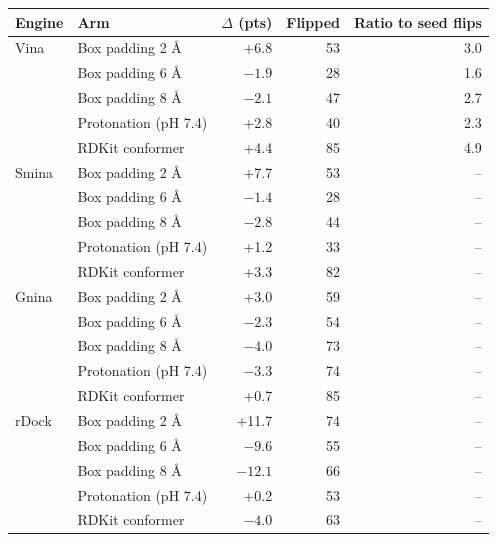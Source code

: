 \begin{tabular}{llrrr}
\toprule
Engine & Arm & $\Delta$ (pts) & Flipped & Ratio to seed flips \\
\midrule
Vina & Box padding 2 \AA{} & +6.8 & 53 & 3.0 \\
 & Box padding 6 \AA{} & $-1.9$ & 28 & 1.6 \\
 & Box padding 8 \AA{} & $-2.1$ & 47 & 2.7 \\
 & Protonation (pH 7.4) & +2.8 & 40 & 2.3 \\
 & RDKit conformer & +4.4 & 85 & 4.9 \\
\addlinespace
Smina & Box padding 2 \AA{} & +7.7 & 53 & -- \\
 & Box padding 6 \AA{} & $-1.4$ & 28 & -- \\
 & Box padding 8 \AA{} & $-2.8$ & 44 & -- \\
 & Protonation (pH 7.4) & +1.2 & 33 & -- \\
 & RDKit conformer & +3.3 & 82 & -- \\
\addlinespace
Gnina & Box padding 2 \AA{} & +3.0 & 59 & -- \\
 & Box padding 6 \AA{} & $-2.3$ & 54 & -- \\
 & Box padding 8 \AA{} & $-4.0$ & 73 & -- \\
 & Protonation (pH 7.4) & $-3.3$ & 74 & -- \\
 & RDKit conformer & +0.7 & 85 & -- \\
\addlinespace
rDock & Box padding 2 \AA{} & +11.7 & 74 & -- \\
 & Box padding 6 \AA{} & $-9.6$ & 55 & -- \\
 & Box padding 8 \AA{} & $-12.1$ & 66 & -- \\
 & Protonation (pH 7.4) & +0.2 & 53 & -- \\
 & RDKit conformer & $-4.0$ & 63 & -- \\
\bottomrule
\end{tabular}
